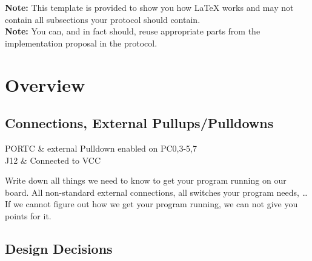 \documentclass[12pt,a4paper,titlepage,oneside]{article}
\begin{document}
\MakeTitleAndTOC



\noindent
\textbf{Note:} This template is provided to show you how \LaTeX{} works and may
not contain all subsections your protocol should contain.\\
\textbf{Note:} You can, and in fact should, reuse appropriate parts
from the implementation proposal in the protocol.


\section{Overview}

\subsection{Connections,  External Pullups/Pulldowns}

PORTC & external Pulldown enabled on PC0,3-5,7 \\
J12 & Connected to VCC \\
\eConnections

Write down all things we need to know to get your program running on our board.
All non-standard external connections, all switches your program needs, \dots
If we cannot figure out how we get your program running, we can not give you
points for it.


\subsection{Design Decisions}
\end{document}
